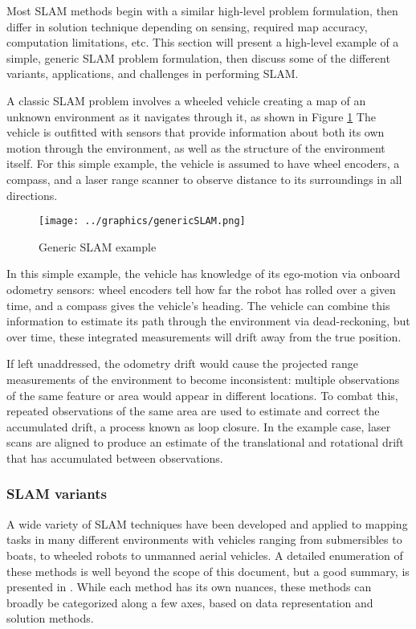 Most SLAM methods begin with a similar high-level problem formulation, then differ in solution technique depending on sensing, required map accuracy, computation limitations, etc. This section will present a high-level example of a simple, generic SLAM problem formulation, then discuss some of the different variants, applications, and challenges in performing SLAM. 

\label{sec:genericSLAM}
A classic SLAM problem involves a wheeled vehicle creating a map of an unknown environment as it navigates through it, as shown in Figure \ref{fig:GenericSLAM} The vehicle is outfitted with sensors that provide information about both its own motion through the environment, as well as the structure of the environment itself. For this simple example, the vehicle is assumed to have wheel encoders, a compass, and a laser range scanner to observe distance to its surroundings in all directions.

 \begin{figure}[!htb]
   \centering
   \texttt{[image: ../graphics/genericSLAM.png]} %
   \caption{ Generic SLAM example}
   \label{fig:GenericSLAM}
\end{figure}


In this simple example, the vehicle has knowledge of its ego-motion via onboard odometry sensors: wheel encoders tell how far the robot has rolled over a given time, and a compass gives the vehicle's heading. The vehicle can combine this information to estimate its path through the environment via dead-reckoning, but over time, these integrated measurements will drift away from the true position.

If left unaddressed, the odometry drift would cause the projected range measurements of the environment to become inconsistent: multiple observations of the same feature or area would appear in different locations. To combat this, repeated observations of the same area are used to estimate and correct the accumulated drift, a process known as loop closure. In the example case, laser scans are aligned to produce an estimate of the translational and rotational drift that has accumulated between observations. 


\subsubsection{SLAM variants}

A wide variety of SLAM techniques have been developed and applied to mapping tasks in many different environments with vehicles ranging from submersibles to boats, to wheeled robots to unmanned aerial vehicles. A detailed enumeration of these methods is well beyond the scope of this document, but a good summary, is presented in \cite{SLAMoverview}. While each method has its own nuances, these methods can broadly be categorized along a few axes, based on data representation and solution methods. 

